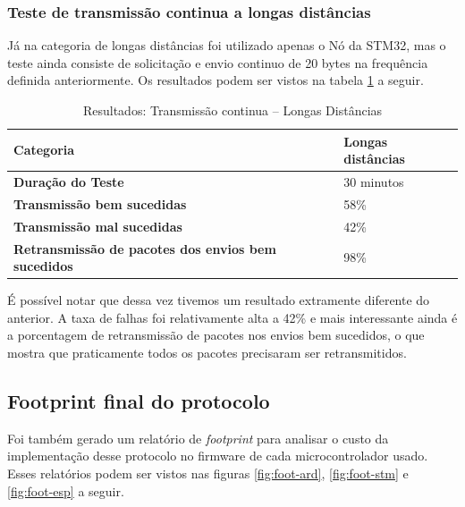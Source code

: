 \subsubsection{Teste de transmissão continua a longas distâncias}

Já na categoria de longas distâncias foi utilizado apenas o Nó da STM32, mas o teste
ainda consiste de solicitação e envio continuo de 20 bytes na frequência definida anteriormente.
Os resultados podem ser vistos na tabela \ref{tab:result-long} a seguir.

\begin{longtable}{|l|l|}
    \caption{Resultados: Transmissão continua -- Longas Distâncias}\label{tab:result-long}\\
    \hline
    \textbf{Categoria} & Longas distâncias \\
    \hline
    \textbf{Duração do Teste} & 30 minutos \\
    \hline
    \textbf{Transmissão bem sucedidas} & 58\% \\
    \hline
    \textbf{Transmissão mal sucedidas} & 42\% \\
    \hline
    \textbf{Retransmissão de pacotes dos envios bem sucedidos} & 98\% \\
    \hline
\end{longtable}

É possível notar que dessa vez tivemos um resultado extramente diferente do anterior.
A taxa de falhas foi relativamente alta a 42\% e mais interessante ainda é a porcentagem
de retransmissão de pacotes nos envios bem sucedidos, o que mostra que praticamente todos
os pacotes precisaram ser retransmitidos.

\subsection{Footprint final do protocolo}

Foi também gerado um relatório de \textit{footprint} para analisar o custo da implementação
desse protocolo no firmware de cada microcontrolador usado. Esses relatórios podem ser vistos
nas figuras \ref{fig:foot-ard}, \ref{fig:foot-stm} e \ref{fig:foot-esp} a seguir.

